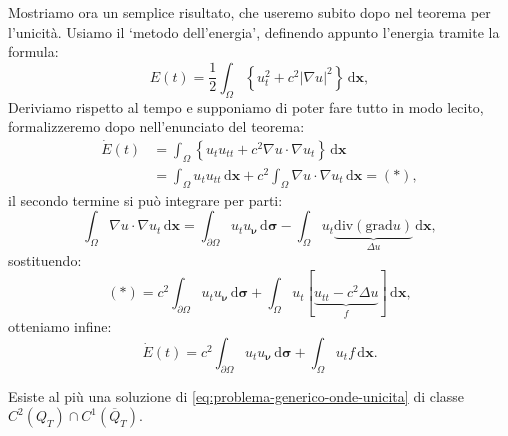 \documentclass[10pt,a4paper,twoside,openright]{book}
\newcommand{\x}{\mathbf{x}}
\newcommand{\sigg}{\bm{\sigma}}
\newcommand{\de}{\,\mathrm d}
\newcommand{\dxx}{\de \x}
\newcommand{\dsig}{\de \sigg}
\begin{document}
Mostriamo ora un semplice risultato, che useremo subito dopo nel teorema per l'unicità. Usiamo il `metodo dell'energia', definendo appunto l'energia tramite la formula:
\begin{equation}
    E(t) =\frac{1}{2}\int _{\Omega }\left\{u_{t}^{2} +c^{2}| \nabla u| ^{2}\right\} \dxx ,
\end{equation}
Deriviamo rispetto al tempo e supponiamo di poter fare tutto in modo lecito, formalizzeremo dopo nell'enunciato del teorema:
\begin{align*}
    \dot{E}(t) & =\int _{\Omega }\left\{u_{t} u_{tt} +c^{2} \nabla u\cdotp \nabla u_{t}\right\} \dxx              \\
               & =\int _{\Omega } u_{t} u_{tt} \dxx +c^{2}\int _{\Omega } \nabla u\cdotp \nabla u_{t} \dxx =(*) ,
\end{align*}
il secondo termine si può integrare per parti:
\begin{equation*}
    \int _{\Omega } \nabla u\cdotp \nabla u_{t} \dxx =\int _{\partial \Omega } u_{t} u_{\bm{\nu }} \dsig -\int _{\Omega } u_{t}\underbrace{\mathrm{div}(\mathrm{grad} u)}_{\Delta u} \dxx ,
\end{equation*}
sostituendo:
\begin{equation*}
    (*) =c^{2}\int _{\partial \Omega } u_{t} u_{\bm{\nu }} \dsig +\int _{\Omega } u_{t}[\underbrace{u_{tt} -c^{2} \Delta u}_{f}] \dxx ,
\end{equation*}
otteniamo infine:
\begin{equation}
    \dot{E}(t) =c^{2}\int _{\partial \Omega } u_{t} u_{\bm{\nu }} \dsig +\int _{\Omega } u_{t} f\dxx .
    \label{eq:onde-derivata-energia}
\end{equation}
\begin{theorem}
    Esiste al più una soluzione di \eqref{eq:problema-generico-onde-unicita} di classe $C^{2}(Q_{T}) \cap C^{1}(\overline{Q}_{T})$.
\end{theorem}
\end{document}
